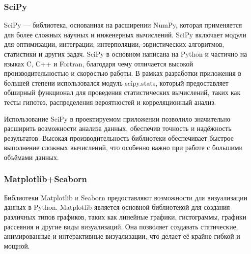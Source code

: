 

\subsubsection{SciPy}

SciPy --- библиотека, основанная на расширении NumPy, которая применяется для более сложных научных и инженерных вычислений. SciPy включает модули для оптимизации, интеграции, интерполяции, эвристических алгоритмов, статистики и других задач. SciPy в основном написана на Python и частично на языках C, C++ и Fortran, благодаря чему отличается высокой производительностью и скоростью работы. В рамках разработки приложения в большей степени использовался модуль scipy.stats, который предоставляет обширный функционал для проведения статистических вычислений, таких как тесты гипотез, распределения вероятностей и корреляционный анализ.

Использование SciPy в проектируемом приложении позволило значительно расширить возможности анализа данных, обеспечив точность и надёжность результатов. Высокая производительность библиотеки обеспечивает быстрое выполнение сложных вычислений, что особенно важно при работе с большими объёмами данных.


\subsubsection{Matplotlib+Seaborn}

Библиотеки Matplotlib и Seaborn предоставляют возможности для визуализации данных в Python. Matplotlib является основной библиотекой для создания различных типов графиков, таких как линейные графики, гистограммы, графики рассеяния и другие виды визуализаций. Она позволяет создавать статические, анимированные и интерактивные визуализации, что делает её крайне гибкой и мощной.

